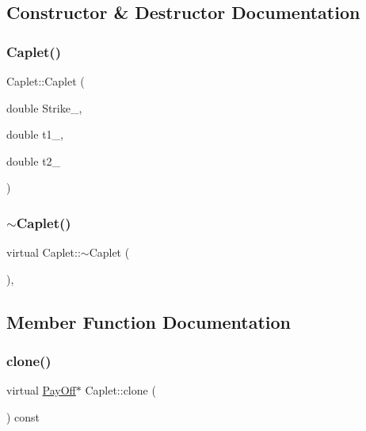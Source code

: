 \subsection{Constructor \& Destructor Documentation}
\hypertarget{classCaplet_a350941f2d902ebcc9332bd2dc33e442a}{}\label{classCaplet_a350941f2d902ebcc9332bd2dc33e442a} 
\subsubsection{\texorpdfstring{Caplet()}{Caplet()}}
{\footnotesize\ttfamily Caplet\+::\+Caplet (\begin{DoxyParamCaption}\item[{double}]{Strike\+\_\+,  }\item[{double}]{t1\+\_\+,  }\item[{double}]{t2\+\_\+ }\end{DoxyParamCaption})}

\hypertarget{classCaplet_ac0fad0b6aeef3bd1d2d88d280ebd5072}{}\label{classCaplet_ac0fad0b6aeef3bd1d2d88d280ebd5072} 
\subsubsection{\texorpdfstring{$\sim$\+Caplet()}{~Caplet()}}
{\footnotesize\ttfamily virtual Caplet\+::$\sim$\+Caplet (\begin{DoxyParamCaption}{ }\end{DoxyParamCaption})\hspace{0.3cm}{\ttfamily [inline]}, {\ttfamily [virtual]}}



\subsection{Member Function Documentation}
\hypertarget{classCaplet_aeadd950733f02c066c474badceb277ef}{}\label{classCaplet_aeadd950733f02c066c474badceb277ef} 
\subsubsection{\texorpdfstring{clone()}{clone()}}
{\footnotesize\ttfamily virtual \hyperlink{classPayOff}{Pay\+Off}$\ast$ Caplet\+::clone (\begin{DoxyParamCaption}{ }\end{DoxyParamCaption}) const\hspace{0.3cm}{\ttfamily [virtual]}}



